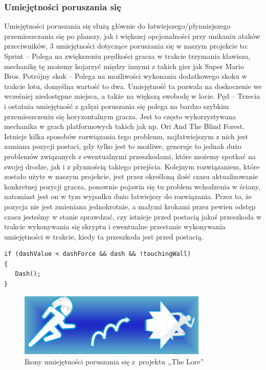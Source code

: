 \documentclass[oneside,polski,logo]{amuthesis}
\begin{document}
\subsubsection{Umiejętności poruszania się}
Umiejętności poruszania się służą głównie do łatwiejszego/płynniejszego przemieszczania się po planszy, jak i większej opcjonalności przy unikaniu ataków przeciwników, 3 umiejętności dotyczące poruszania się w naszym projekcie to:
Sprint – Polega na zwiększeniu prędkości gracza w trakcie trzymania klawisza, mechanikę tę możemy kojarzyć między innymi z takich gier jak Super Mario Bros.
Potrójny skok – Polega na możliwości wykonania dodatkowego skoku w trakcie lotu, domyślna wartość to dwa. Umiejętność ta pozwala na doskoczenie we wcześniej niedostępne miejsca, a także na większą swobodę w locie.
Pęd – Trzecia i ostatnia umiejętność z gałęzi poruszania się polega na bardzo szybkim przemieszczeniu się horyzontalnym gracza. Jest to często wykorzystywana mechanika w grach platformowych takich jak np. Ori And The Blind Forest. Istnieje kilka sposobów rozwiązania tego problemu, najłatwiejszym z nich jest zamiana pozycji postaci, gdy tylko jest to możliwe, generuje to jednak dużo problemów związanych z ewentualnymi przeszkodami, które możemy spotkać na swojej drodze, jak i z płynnością takiego przejścia. Kolejnym rozwiązaniem, które zostało użyte w naszym projekcie, jest przez określoną ilość czasu aktualizowanie konkretnej pozycji gracza, ponownie pojawia się tu problem wchodzenia w ściany, natomiast jest on w tym wypadku dużo łatwiejszy do rozwiązania. Przez to, że pozycja nie jest zmieniana jednokrotnie, a małymi krokami przez pewien odstęp czasu jesteśmy w stanie sprawdzać, czy istnieje przed postacią jakaś przeszkoda w trakcie wykonywania się skryptu i ewentualne przestanie wykonywania umiejętności w trakcie, kiedy ta przeszkoda jest przed postacią.


\begin{lstlisting}[breaklines=true,
language={[Sharp]C},
rulecolor=\color{blue!80!black},
caption={Fragment klasy \texttt{PlayerSkills.cs}}
]    
if (dashValue < dashForce && dash && !touchingWall)
{
   Dash();
}
\end{lstlisting}
\begin{figure}[h]
	\centering
	\includegraphics[width=9cm]{images/kozubal/movement.png}
	\caption{Ikony umiejętności poruszania się z~projektu ,,The Lore''}
\end{figure}
\end{document}
